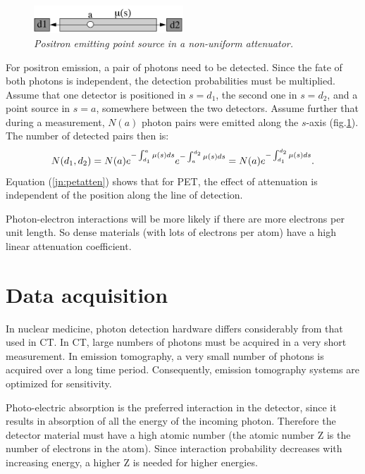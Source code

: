 \documentclass[11pt,oneside]{article}
\begin{document}
\begin{figure}[tb]
\centering
\includegraphics[width=0.5\textwidth]{figs/fig_jnpetatten.pdf}
\caption{\label{fig:jn_petatten} \emph{Positron emitting point source in a
non-uniform attenuator.}}
\end{figure}
For positron emission, a pair of photons need to be detected. Since the fate
of both photons is independent, the detection probabilities must be
multiplied.  Assume that one detector is positioned in $s = d_1$, the second
one in $s = d_2$, and a point source in $s = a$, somewhere between the two
detectors. Assume further that during a measurement, $N(a)$ photon pairs were
emitted along the $s$-axis (fig.\ref{fig:jn_petatten}). The number of
detected pairs then is:
\begin{equation}
  N(d_1,d_2) = N(a)  e^{- \int_{d_1}^a \mu(s) ds} e^{- \int_a^{d_2} \mu(s)
             ds} \\
             = N(a)  e^{- \int_{d_1}^{d_2} \mu(s) ds}. \\
\label{jn:petatten}
\end{equation}
Equation (\ref{jn:petatten}) shows that for PET, the effect of attenuation is
independent of the position along the line of detection.

Photon-electron interactions will be more likely if there are more electrons
per unit length. So dense materials (with lots of electrons per atom) have a
high linear attenuation coefficient.

\section{Data acquisition}

In nuclear medicine, photon detection hardware differs considerably from that
used in CT. In CT, large numbers of photons must be acquired in a very short
measurement. In emission tomography, a very small number of photons is
acquired over a long time period. Consequently, emission tomography systems are
optimized for sensitivity.

Photo-electric absorption is the preferred interaction in the detector, since
it results in absorption of all the energy of the incoming photon. Therefore
the detector material must have a high atomic number (the atomic number Z is
the number of electrons in the atom). Since interaction probability decreases
with increasing energy, a higher Z is needed for higher energies.
\end{document}
